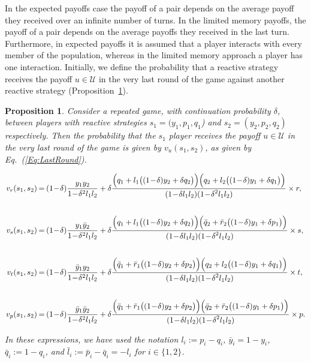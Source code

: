 \documentclass[11pt]{article}
\theoremstyle{plainCl1}
\newtheorem{Prop}{Proposition}
\theoremstyle{plainCl2}
\begin{document}
In the expected payoffs case the payoff of a pair depends on the average payoff
they received over an infinite number of turns. In the limited memory payoffs,
the payoff of a pair depends on the average payoffs they received in the last
turn. Furthermore, in expected payoffs it is assumed that a player interacts
with every member of the population, whereas in the limited memory approach a
player has one interaction. Initially, we define the probability that a reactive
strategy receives the payoff $u\!\in\! \mathcal{U}$ in the very last round of
the game against another reactive strategy
(Proposition~\ref{proposition:last_round}).

\begin{Prop}\label{proposition:last_round} Consider a repeated game, with
    continuation probability $\delta$, between players with reactive strategies
    $s_1\!=\!(y_1, p_1, q_1$)  and $s_2\!=\!(y_2,p_2,q_2)$ respectively. Then
    the probability that the $s_1$ player receives the payoff $u\!\in\!
    \mathcal{U}$ in the very last round of the game is given by
    $v_{u}(s_1,s_2)$, as given by Eq.~(\ref{Eq:LastRound}).

    \begin{equation} \label{Eq:LastRound}
      \setlength{\arraycolsep}{1pt}
      \begin{array}{rcl}
    
      v_{r}(s_1,s_2) &= &\displaystyle (1\!-\!\delta)\frac{y_1y_2}{1\!-\!\delta^2 l_1 l_2}+\delta \frac{\Big(q_1+l_1\big((1\!-\!\delta)y_2+\delta q_2\big)\Big) \Big(q_2+l_2\big((1\!-\!\delta)y_1+\delta q_1\big)\Big)}
      {\displaystyle(1\!-\!\delta l_1l_2)(1\!-\!\delta^2 l_1 l_2)} \times r,\\[1cm]
    
      v_{s}(s_1,s_2) &= &\displaystyle (1\!-\!\delta)\frac{y_1\bar{y}_2}{1\!-\!\delta^2 l_1 l_2}+\delta \frac{\Big(q_1+l_1\big((1\!-\!\delta)y_2+\delta q_2\big)\Big) \Big(\bar{q}_2+\bar{r}_2\big((1\!-\!\delta)y_1+\delta p_1\big)\Big)}
      {\displaystyle(1\!-\!\delta l_1l_2)(1\!-\!\delta^2 l_1 l_2)} \times s,\\[1cm]
    
      v_{t}(s_1,s_2) &= &\displaystyle (1\!-\!\delta)\frac{\bar{y}_1y_2}{1\!-\!\delta^2 l_1 l_2}+\delta \frac{\Big(\bar{q}_1+\bar{r}_1\big((1\!-\!\delta)y_2+\delta p_2\big)\Big) \Big(q_2+l_2\big((1\!-\!\delta)y_1+\delta q_1\big)\Big)}
      {\displaystyle(1\!-\!\delta l_1l_2)(1\!-\!\delta^2 l_1 l_2)} \times t,\\[1cm]
    
      v_{p}(s_1,s_2) &= &\displaystyle (1\!-\!\delta)\frac{\bar{y}_1\bar{y}_2}{1\!-\!\delta^2 l_1 l_2}+\delta \frac{\Big(\bar{q}_1+\bar{r}_1\big((1\!-\!\delta)y_2+\delta p_2\big)\Big) \Big(\bar{q}_2+\bar{r}_2\big((1\!-\!\delta)y_1+\delta p_1\big)\Big)}
      {\displaystyle(1\!-\!\delta l_1l_2)(1\!-\!\delta^2 l_1 l_2)} \times p.
      \end{array}
    \end{equation}

In these expressions, we have used the notation $l_i:=p_i\!-\!q_i$,
$\bar{y}_i\!=\!1\!-\!y_i$, $\bar{q}_i:=1\!-\!q_i$, and
$\bar{l}_i:=\bar{p}_i\!-\!\bar{q}_i=-l_i$ for $i\!\in\!\{1,2\}$.
\end{Prop}
\end{document}
